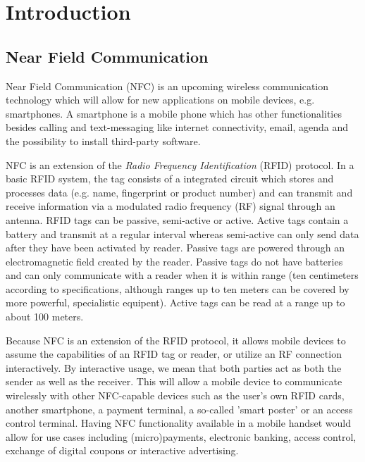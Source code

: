 \section{Introduction}


\subsection{Near Field Communication} %
Near Field Communication (NFC) is an upcoming wireless communication technology which will allow for new applications on mobile devices, e.g. smartphones.
A smartphone is a mobile phone which has other functionalities besides calling and text-messaging like internet connectivity, email, agenda and the possibility to install third-party software.

NFC is an extension of the \textit{Radio Frequency Identification} (RFID) protocol.
In a basic RFID system, the tag consists of a integrated circuit which stores and processes data (e.g. name, fingerprint or product number) and can transmit and receive information via a modulated radio frequency (RF) signal through an antenna.
RFID tags can be passive, semi-active or active.
Active tags contain a battery and transmit at a regular interval whereas semi-active can only send data after they have been activated by reader.
Passive tags are powered through an electromagnetic field created by the reader.
Passive tags do not have batteries and can only communicate with a reader when it is within range (ten centimeters according to specifications, although ranges up to ten meters can be covered by more powerful, specialistic equipent).
Active tags can be read at a range up to about 100 meters.
 
Because NFC is an extension of the RFID protocol, it allows mobile devices to assume the capabilities of an RFID tag or reader, or utilize an RF connection interactively.
By interactive usage, we mean that both parties act as both the sender as well as the receiver.
This will allow a mobile device to communicate wirelessly  with other NFC-capable devices such as the user's own RFID cards, another smartphone, a payment terminal, a so-called 'smart poster' or an access control terminal.
Having NFC functionality available in a mobile handset would allow for use cases including (micro)payments, electronic banking, access control, exchange of digital coupons or interactive advertising.

